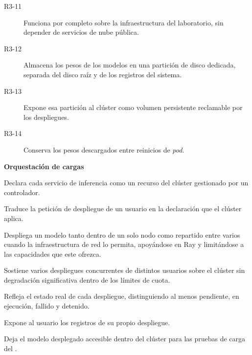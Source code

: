 \begin{description}
  \item[R3-11] Funciona por completo sobre la infraestructura del laboratorio, sin depender de servicios de nube pública.
  \item[R3-12] Almacena los pesos de los modelos en una partición de disco dedicada, separada del disco raíz y de los registros del sistema.
  \item[R3-13] Expone esa partición al clúster como volumen persistente reclamable por los despliegues.
  \item[R3-14] Conserva los pesos descargados entre reinicios de \emph{pod}.
\end{description}

\noindent\textbf{Orquestación de cargas}
\begin{description}
\setlength{\itemsep}{4pt}
  \item[R3-15] Declara cada servicio de inferencia como un recurso del clúster gestionado por un controlador.
  \item[R3-16] Traduce la petición de despliegue de un usuario en la declaración que el clúster aplica.
  \item[R3-17] Despliega un modelo tanto dentro de un solo nodo como repartido entre varios cuando la infraestructura de red lo permita, apoyándose en Ray y limitándose a las capacidades que este ofrezca.
  \item[R3-18] Sostiene varios despliegues concurrentes de distintos usuarios sobre el clúster sin degradación significativa dentro de los límites de cuota.
  \item[R3-19] Refleja el estado real de cada despliegue, distinguiendo al menos pendiente, en ejecución, fallido y detenido.
  \item[R3-20] Expone al usuario los registros de su propio despliegue.
  \item[R3-21] Deja el modelo desplegado accesible dentro del clúster para las pruebas de carga del .
\end{description}

